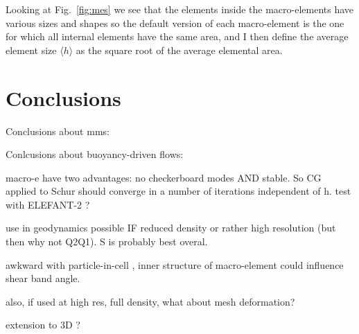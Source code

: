 \documentclass[a4paper]{article}
\begin{document}
Looking at Fig.~\ref{fig:mes} we see that the elements inside the macro-elements 
have various sizes and shapes so 
the default version of each macro-element is the one for which all internal elements have the same area, and 
I then define the average element size
$\langle h \rangle$ as the square root of the average elemental area.










\section{Conclusions}\label{sec5}

Conclusions about mms:



Conlcusions about buoyancy-driven flows:

macro-e have two advantages: no checkerboard modes AND stable. So CG applied to Schur should converge in a number of iterations independent of h. test with ELEFANT-2 ?

use in geodynamics possible IF reduced density or rather high resolution (but then why not Q2Q1). S is probably best overal.

awkward with particle-in-cell , inner structure of macro-element could influence shear band angle. 

also, if used at high res, full density, what about mesh deformation?

extension to 3D ?




\printbibliography
\end{document}
